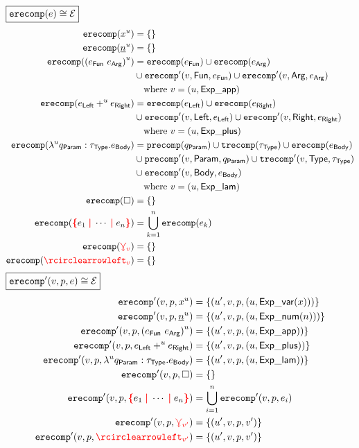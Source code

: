 \noindent $\boxed{\operatorname{\texttt{erecomp}}\mathopen{}\left(e\right)\mathclose{} \cong \mathcal{E}}$
%
\begin{align*}
  \erecomp{\varExp{x}{u}} &= \SetOf{}
  \\
  \erecomp{\numExp{n}{u}} &= \SetOf{}
  \\
  \erecomp{\appExp{e_\AppFun}{e_\AppArg}{u}}
  &= \erecomp{e_\AppFun}
  \cup \erecomp{e_\AppArg} \\
  &\cup \erecompPrime{v}{\AppFun}{e_\AppFun}
  \cup \erecompPrime{v}{\AppArg}{e_\AppArg} \\
  &\quad\text{where } v = (u, \ExpApp)
  \\
  \erecomp{\plusExp{e_\PlusLeft}{u}{e_\PlusRight}}
  &= \erecomp{e_\PlusLeft}
  \cup \erecomp{e_\PlusRight} \\
  &\cup \erecompPrime{v}{\PlusLeft}{e_\PlusLeft}
  \cup \erecompPrime{v}{\PlusRight}{e_\PlusRight} \\
  &\quad\text{where } v = (u, \ExpPlus)
  \\
  \erecomp{\lamExp{u}{q_\LamParam}{\tau_\LamType}{e_\LamBody}}
  &= \precomp{q_\LamParam}
  \cup \trecomp{\tau_\LamType}
  \cup \erecomp{e_\LamBody} \\
  &\cup \precompPrime{v}{\LamParam}{q_\LamParam}
  \cup \trecompPrime{v}{\LamType}{\tau_\LamType} \\
  &\cup \erecompPrime{v}{\LamBody}{e_\LamBody} \\
  &\quad\text{where } v = (u, \ExpLam)
  \\
  \erecomp{\hole} &= \SetOf{}
  \\
  \erecomp{\conflictHole{e_1, \cdots, e_n}}
  &= \bigcup_{k=1}^n \erecomp{e_k}
  \\
  \erecomp{\multiVertex{v}} &= \SetOf{}
  \\
  \erecomp{\cycleVertex{v}} &= \SetOf{}
\end{align*}
%
$\boxed{\operatorname{\operatorname{\texttt{erecomp}}^\prime}\mathopen{}\left(v, p, e\right)\mathclose{} \cong \mathcal{E}}$
%
\begin{align*}
  \erecompPrime{v}{p}{\varExp{x}{u}}
  &= \SetOf{(u', v, p, (u, \ExpVar(x)))}
  \\
  \erecompPrime{v}{p}{\numExp{n}{u}}
  &= \SetOf{(u', v, p, (u, \ExpNum(n)))}
  \\
  \erecompPrime{v}{p}{\appExp{e_\AppFun}{e_\AppArg}{u}}
  &= \SetOf{(u', v, p, (u, \ExpApp))}
  \\
  \erecompPrime{v}{p}{\plusExp{e_\PlusLeft}{u} {e_\PlusRight}}
  &= \SetOf{(u', v, p, (u, \ExpPlus))}
  \\
  \erecompPrime{v}{p}{\lamExp{u}{q_\LamParam}{\tau_\LamType}{e_\LamBody}}
  &= \SetOf{(u', v, p, (u, \ExpLam))}
  \\
  \erecompPrime{v}{p}{\hole} &= \SetOf{}
  \\
  \erecompPrime{v}{p}{\conflictHole{e_1, \cdots, e_n}}
  &= \bigcup_{i=1}^n \erecompPrime{v}{p}{e_i}
  \\
  \erecompPrime{v}{p}{\multiVertex{v'}}
  &= \SetOf{(u', v, p, v')}
  \\
  \erecompPrime{v}{p}{\cycleVertex{v'}}
  &= \SetOf{(u', v, p, v')}
\end{align*}
